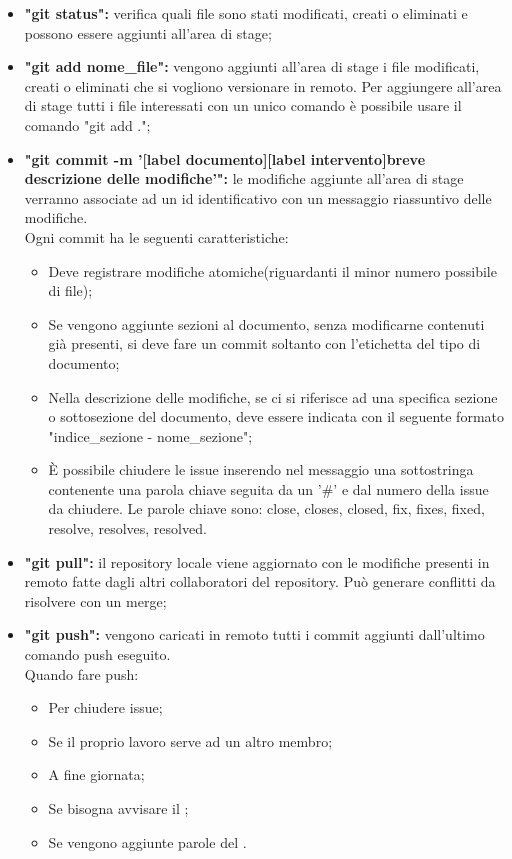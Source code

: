 \begin{itemize}
	\item \textbf{"git status":} verifica quali file sono stati modificati, creati o eliminati e possono essere aggiunti all'area di stage;
	\item \textbf{"git add nome\_file":} vengono aggiunti all'area di stage i file modificati, creati o eliminati che si vogliono versionare in remoto. Per aggiungere all'area di stage tutti i file interessati con un unico comando è possibile usare il comando "git add .";
	\item \textbf{"git commit -m '[label documento][label intervento]breve descrizione delle modifiche'":} le modifiche aggiunte all'area di stage verranno associate ad un id identificativo con un messaggio riassuntivo delle modifiche. \\Ogni commit ha le seguenti caratteristiche:
	\begin{itemize}
		\item Deve registrare modifiche atomiche(riguardanti il minor numero possibile di file);
		\item Se vengono aggiunte sezioni al documento, senza modificarne contenuti già presenti, si deve fare un commit soltanto con l'etichetta del tipo di documento;
		\item Nella descrizione delle modifiche, se ci si riferisce ad una specifica sezione o sottosezione del documento, deve essere indicata con il seguente formato "indice\_sezione - nome\_sezione";
		\item È possibile chiudere le issue inserendo nel messaggio una sottostringa contenente una parola chiave seguita da un '\#' e dal numero della issue da chiudere. Le parole chiave sono: close, closes, closed, fix, fixes, fixed, resolve, resolves, resolved.
	\end{itemize}
	\item \textbf{"git pull":} il repository locale viene aggiornato con le modifiche presenti in remoto fatte dagli altri collaboratori del repository. Può generare conflitti da risolvere con un merge;
	\item \textbf{"git push":} vengono caricati in remoto tutti i commit aggiunti dall'ultimo comando push eseguito.\\
	Quando fare push:
	\begin{itemize}
		\item Per chiudere issue;
		\item Se il proprio lavoro serve ad un altro membro;
		\item A fine giornata;
		\item Se bisogna avvisare il \roleProjectManager{};
		\item Se vengono aggiunte parole del \docNameVersionGlo{}.
	\end{itemize}
\end{itemize}

